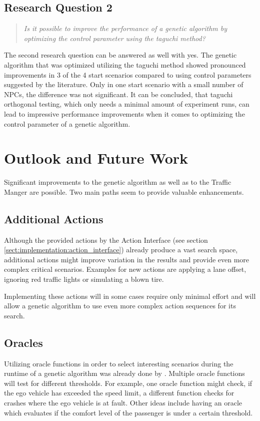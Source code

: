 \subsection{Research Question 2}
\begin{quote}
	\begin{em}
		\textit{Is it possible to improve the performance of a genetic algorithm by optimizing the control parameter using the taguchi method?}
	\end{em}
\end{quote}

The second research question can be answered as well with yes. The genetic algorithm that was optimized utilizing the taguchi method showed pronounced improvements in 3 of the 4 start scenarios compared to using control parameters suggested by the literature. Only in one start scenario with a small number of NPCs, the difference was not significant. It can be concluded, that taguchi orthogonal testing, which only needs a minimal amount of experiment runs, can lead to impressive performance improvements when it comes to optimizing the control parameter of a genetic algorithm.

\section{Outlook and Future Work}
Significant improvements to the genetic algorithm as well as to the Traffic Manger are possible. Two main paths seem to provide valuable enhancements.

\subsection{Additional Actions}
Although the provided actions by the Action Interface (see section \ref{sect:implementation:action_interface}) already produce a vast search space, additional actions might improve variation in the results and provide even more complex critical scenarios. Examples for new actions are applying a lane offset, ignoring red traffic lights or simulating a blown tire.

Implementing these actions will in some cases require only minimal effort and will allow a genetic algorithm to use even more complex action sequences for its search.

\subsection{Oracles}
Utilizing oracle functions in order to select interesting scenarios during the runtime of a genetic algorithm was already done by \cite{almanee_scenorita_2021}. Multiple oracle functions will test for different thresholds. For example, one oracle function might check, if the ego vehicle has exceeded the speed limit, a different function checks for crashes where the ego vehicle is at fault. Other ideas include having an oracle which evaluates if the comfort level of the passenger is under a certain threshold.

